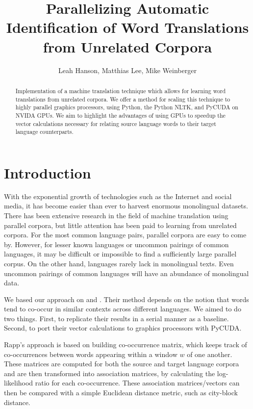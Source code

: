 \documentclass[12pt]{article}
\title{Parallelizing Automatic Identification of Word Translations from Unrelated Corpora}
\author{Leah Hanson, Matthias Lee, Mike Weinberger}
\begin{document}
\maketitle
\begin{abstract}

Implementation of a machine translation technique which allows for learning word translations from unrelated corpora. We offer a method for scaling this technique to highly parallel graphics processors, using Python, the Python NLTK, and PyCUDA on NVIDA GPUs. We aim to highlight the advantages of using GPUs to speedup the vector calculations necessary for relating source language words to their target language counterparts.

\end{abstract}
\section{Introduction}

With the exponential growth of technologies such as the Internet and social media, it has become easier than ever to harvest enormous monolingual datasets. There has been extensive research in the field of machine translation using parallel corpora, but little attention has been paid to learning from unrelated corpora. For the most common language pairs, parallel corpora are easy to come by. However, for lesser known languages or uncommon pairings of common languages, it may be difficult or impossible to find a sufficiently large parallel corpus. On the other hand, languages rarely lack in monolingual texts. Even uncommon pairings of common languages will have an abundance of monolingual data.


We based our approach on \cite{rapp1999automatic} and \cite{rapp1995identifying}. Their method depends on the notion that words tend to co-occur in similar contexts across different languages. We aimed to do two things. First, to replicate their results in a serial manner as a baseline. Second, to port their vector calculations to graphics processors with PyCUDA.

Rapp's approach is based on building co-occurrence matrix, which keeps track of co-occurrences between words appearing within a window $w$ of one another. These matrices are computed for both the source and target language corpora and are then transformed into association matrices, by calculating the log-likelihood ratio for each co-occurrence. These association matrices/vectors can then be compared with a simple Euclidean distance metric, such as city-block distance.
\end{document}
